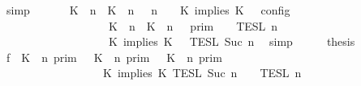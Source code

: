 \begin{isabellebody}
\ simp\isanewline
\ \ \isamarkupfalse%
\ \isamarkupfalse%
\ {\isacartoucheopen}{\isasymlbrakk}\ {\isacharparenleft}{\isacharparenleft}K\ {\isasymUp}\ n{\isacharparenright}\ {\isacharhash}\ {\isacharparenleft}K\ {\isasymUp}\ n{\isacharparenright}\ {\isacharhash}\ {\isasymGamma}{\isacharparenright}{\isacharcomma}\ n\ {\isasymturnstile}\ {\isasymPsi}\ {\isasymtriangleright}\ {\isacharparenleft}{\isacharparenleft}K\ implies\ K\ {\isacharhash}\ {\isasymPhi}{\isacharparenright}\ {\isasymrbrakk}\isactrlsub c\isactrlsub o\isactrlsub n\isactrlsub f\isactrlsub i\isactrlsub g\isanewline
\ \ \ \ \ \ \ \ \ \ \ \ \ \ \ \ {\isacharequal}\ \ {\isasymlbrakk}{\isasymlbrakk}\ {\isacharparenleft}{\isacharparenleft}K\ {\isasymUp}\ n{\isacharparenright}\ {\isacharhash}\ {\isacharparenleft}K\ {\isasymUp}\ n{\isacharparenright}\ {\isacharhash}\ {\isasymGamma}{\isacharparenright}\ {\isasymrbrakk}{\isasymrbrakk}\isactrlsub p\isactrlsub r\isactrlsub i\isactrlsub m\ {\isasyminter}\ {\isasymlbrakk}{\isasymlbrakk}\ {\isasymPsi}\ {\isasymrbrakk}{\isasymrbrakk}\isactrlsub T\isactrlsub E\isactrlsub S\isactrlsub L\isactrlbsup {\isasymge}\ n\isactrlesup \isanewline
\ \ \ \ \ \ \ \ \ \ \ \ \ \ \ \ \ {\isasyminter}\ {\isasymlbrakk}{\isasymlbrakk}\ {\isacharparenleft}K\ implies\ K\ {\isacharhash}\ {\isasymPhi}\ {\isasymrbrakk}{\isasymrbrakk}\isactrlsub T\isactrlsub E\isactrlsub S\isactrlsub L\isactrlbsup {\isasymge}\ Suc\ n\isactrlesup {\isacartoucheclose}\ \isamarkupfalse%
\ simp\isanewline
\ \ \isamarkupfalse%
\ \isamarkupfalse%
\ {\isacharquery}thesis\isanewline
\ \ \isamarkupfalse%
\ {\isacharminus}\isanewline
\ \ \ \ \isamarkupfalse%
\ f{}{\isacharcolon}\ {\isacartoucheopen}{\isacharparenleft}{\isasymlbrakk}\ K\ {\isasymnot}{\isasymUp}\ n\ {\isasymrbrakk}\isactrlsub p\isactrlsub r\isactrlsub i\isactrlsub m\ {\isasymunion}\ {\isasymlbrakk}\ K\ {\isasymUp}\ n\ {\isasymrbrakk}\isactrlsub p\isactrlsub r\isactrlsub i\isactrlsub m\ {\isasyminter}\ {\isasymlbrakk}\ K\ {\isasymUp}\ n\ {\isasymrbrakk}\isactrlsub p\isactrlsub r\isactrlsub i\isactrlsub m{\isacharparenright}\isanewline
\ \ \ \ \ \ \ \ \ \ \ \ \ \ \ \ {\isasyminter}\ {\isasymlbrakk}\ K\ implies\ K\ {\isasymrbrakk}\isactrlsub T\isactrlsub E\isactrlsub S\isactrlsub L\isactrlbsup {\isasymge}\ Suc\ n\isactrlesup \ {\isasyminter}\ {\isacharparenleft}{\isasymlbrakk}{\isasymlbrakk}\ {\isasymPsi}\ {\isasymrbrakk}{\isasymrbrakk}\isactrlsub T\isactrlsub E\isactrlsub S\isactrlsub L\isactrlbsup {\isasymge}\ n\isactrlesup \isanewline

\end{isabellebody}
